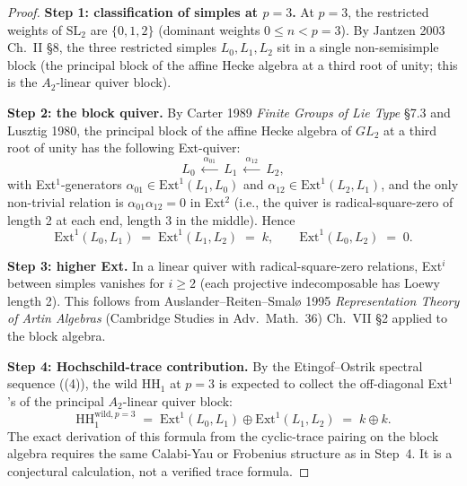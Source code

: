 \begin{proof}
\medskip\noindent\textbf{Step 1: classification of simples at \(p=3\).}
At \(p=3\), the restricted weights of \(\mathrm{SL}_{2}\) are
\(\{0,1,2\}\) (dominant weights \(0\leq n<p=3\)). By Jantzen 2003
Ch.~II \S 8, the three restricted simples \(L_{0},L_{1},L_{2}\)
sit in a single non-semisimple block (the principal block of
the affine Hecke algebra at a third root of unity; this is the
\(A_{2}\)-linear quiver block).

\medskip\noindent\textbf{Step 2: the block quiver.} By Carter 1989
\emph{Finite Groups of Lie Type} \S 7.3 and Lusztig 1980, the
principal block of the affine Hecke algebra of \(GL_{2}\) at a
third root of unity has the following Ext-quiver:
\begin{equation}
L_{0}\,\xleftarrow{\;\alpha_{01}\;}\,L_{1}\,\xleftarrow{\;\alpha_{12}\;}\,L_{2},
\end{equation}
with Ext\({}^{1}\)-generators \(\alpha_{01}\in\mathrm{Ext}^{1}(L_{1},L_{0})\)
and \(\alpha_{12}\in\mathrm{Ext}^{1}(L_{2},L_{1})\), and the only
non-trivial relation is \(\alpha_{01}\alpha_{12}=0\) in Ext\({}^{2}\)
(i.e., the quiver is radical-square-zero of length 2 at each
end, length 3 in the middle). Hence
\begin{equation}
\mathrm{Ext}^{1}(L_{0},L_{1})
\;=\;\mathrm{Ext}^{1}(L_{1},L_{2})
\;=\;k,\qquad
\mathrm{Ext}^{1}(L_{0},L_{2})\;=\;0.
\end{equation}

\medskip\noindent\textbf{Step 3: higher Ext.} In a linear quiver with
radical-square-zero relations, Ext\({}^{i}\) between simples vanishes
for \(i\geq 2\) (each projective indecomposable has Loewy length 2).
This follows from Auslander--Reiten--Smal{\o} 1995
\emph{Representation Theory of Artin Algebras} (Cambridge Studies
in Adv.~Math.~36) Ch.~VII \S 2 applied to the block algebra.

\medskip\noindent\textbf{Step 4: Hochschild-trace contribution.} By the
Etingof--Ostrik spectral sequence
((4)), the wild
\(\mathrm{HH}_{1}\) at \(p=3\) is expected to collect the off-diagonal
Ext\({}^{1}\)'s of the principal \(A_{2}\)-linear quiver block:
\begin{equation}
\mathrm{HH}_{1}^{\mathrm{wild},p=3}
\;=\;\mathrm{Ext}^{1}(L_{0},L_{1})\oplus\mathrm{Ext}^{1}(L_{1},L_{2})
\;=\;k\oplus k.
\end{equation}
The exact derivation of this formula from the cyclic-trace pairing
on the block algebra requires the same Calabi-Yau or Frobenius
structure as in 
Step~4. It is a conjectural calculation, not a verified trace formula.
\end{proof}

